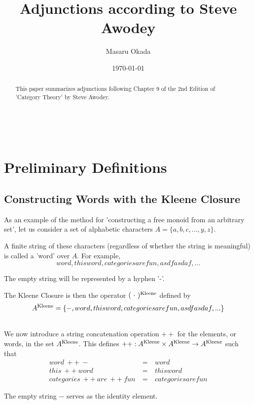 \documentclass[uplatex,a4j,12pt,dvipdfmx]{jsarticle}
\title{
Adjunctions according to Steve Awodey
}
\author{Masaru Okada}
\date{\today}
\begin{document}
\maketitle

\begin{abstract}
	This paper summarizes adjunctions following Chapter 9 of the 2nd Edition of 'Category Theory' by Steve Awodey\cite{Awodey}.
\end{abstract}

\tableofcontents

\ \\

\section{Preliminary Definitions}

\subsection{Constructing Words with the Kleene Closure}

As an example of the method for 'constructing a free monoid from an arbitrary set',
let us consider a set of alphabetic characters $A = \{ a,b,c,...,y,z \}$.

A finite string of these characters (regardless of whether the string is meaningful) is called a 'word' over $A$.
For example,
$$
	word, thisword, categoriesarefun, asdfasdaf, ...
$$

The empty string will be represented by a hyphen '-'.

The Kleene Closure is then the operator $( \ \cdot \ )^{\rm Kleene}$ defined by
$$
	A^{\rm Kleene} = \{ -, word, thisword, categoriesarefun, asdfasdaf, ... \}
$$

\ \\

We now introduce a string concatenation operation $++$ for the elements, or words, in the set $A^{\rm Kleene}$.
This defines $++ : A^{\rm Kleene} \times A^{\rm Kleene} \to A^{\rm Kleene}$ such that
\[
	\begin{array}{rcl}
		word \ ++ \ - \                     & = & \ word             \\
		this \ ++ \ word \                  & = & \ thisword         \\
		categories \ ++ \ are \ ++ \ fun \  & = & \ categoriesarefun
	\end{array}
\]

The empty string $-$ serves as the identity element.
\end{document}
